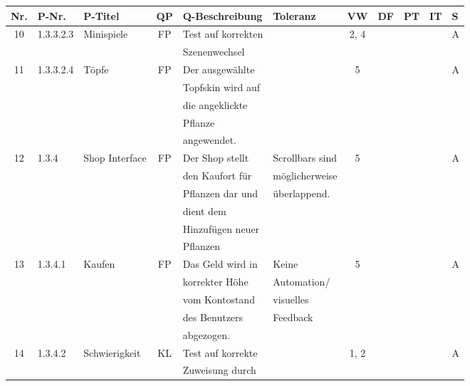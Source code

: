 \begin{longtable}{|c|l|l|c|l|l|c|c|l|l|l|}
            \hline
            Nr. & P-Nr. & P-Titel & QP & Q-Beschreibung & Toleranz & VW & DF & PT & IT & S \\[0.5ex]
            \hline\hline
            10 & 1.3.3.2.3 & Minispiele & FP & Test auf korrekten &  & 2, 4 &  &  &  & A \\
            &       &            &    & Szenenwechsel &   &   & & & &\\
            \hline
            11 & 1.3.3.2.4 & Töpfe & FP & Der ausgewählte &  & 5 &  &  &  & A \\
            &       &            &    & Topfskin wird auf&   &   & & & &\\
            &       &            &    & die angeklickte &   &   & & & &\\
            &       &            &    & Pflanze &   &   & & & &\\
            &       &            &    & angewendet. &   &   & & & &\\
            \hline
            12 & 1.3.4 & Shop Interface & FP & Der Shop stellt & Scrollbars sind & 5 &  &  &  & A \\
            &       &            &    & den Kaufort für & möglicherweise  &   & & & &\\
            &       &            &    & Pflanzen dar und & überlappend.  &   & & & &\\
            &       &            &    & dient dem &   &   & & & &\\
            &       &            &    & Hinzufügen neuer &   &   & & & &\\
            &       &            &    & Pflanzen &   &   & & & &\\
            \hline
            13 & 1.3.4.1 & Kaufen & FP & Das Geld wird in & Keine & 5 &  &  &  & A \\
            &       &            &    & korrekter Höhe & Automation/  &   & & & &\\
            &       &            &    & vom Kontostand &  visuelles &   & & & &\\
            &       &            &    & des Benutzers & Feedback   &   & & & &\\
            &       &            &    & abgezogen. &   &   & & & &\\
            \hline
            14 & 1.3.4.2 & Schwierigkeit & KL & Test auf korrekte &  & 1, 2 &  &  &  & A \\
            &       &            &    & Zuweisung durch &   &   & & & &\\

\end{longtable}
